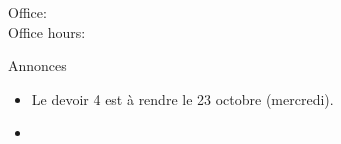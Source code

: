 \documentclass{beamer}
\subtitle[Articles et adverbes]{Les articles de toilette et les adverbes}
\begin{document}
  \begin{frame}
    \titlepage
    \tiny{Office: \\
          Office hours: }
  \end{frame}

  \begin{frame}{Annonces }
    \begin{itemize}
      \item Le devoir 4 est à rendre le 23 octobre (mercredi).
      \item[] 
    \end{itemize}
  \end{frame}
  
\end{document}
